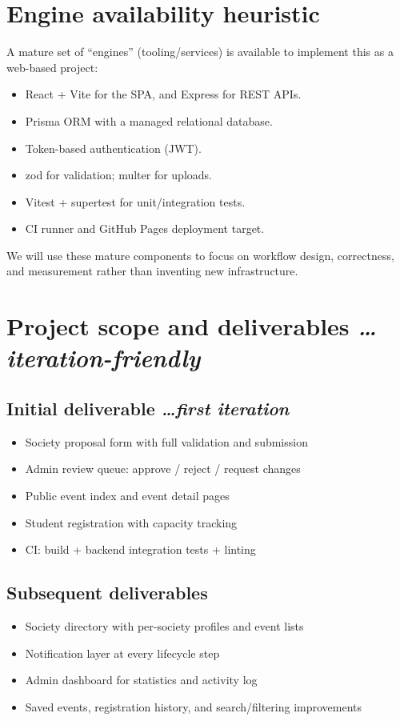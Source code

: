 \documentclass[11pt,a4paper]{article}
\newcommand{\BvrHint}[1]{%
  {\normalfont\normalsize\itshape\hfill #1}}
\begin{document}
\section{Engine availability heuristic}
A mature set of ``engines'' (tooling/services) is
available to implement this as a web-based project:
\begin{itemize}[leftmargin=0.7cm]
    \item React + Vite for the SPA, and Express for REST
      APIs.
    \item Prisma ORM with a managed relational database.
    \item Token-based authentication (JWT).
    \item zod for validation; multer for uploads.
    \item Vitest + supertest for unit/integration tests.
    \item CI runner and GitHub Pages deployment target.
\end{itemize}
We will use these mature components to focus on workflow
design, correctness, and measurement rather than
inventing new infrastructure.

\section{Project scope and deliverables %
\BvrHint{\ldots iteration-friendly}}
\subsection{Initial deliverable %
\BvrHint{\ldots first iteration}}
\begin{itemize}[leftmargin=0.7cm]
    \item Society proposal form with full validation and
      submission
    \item Admin review queue: approve / reject / request
      changes
    \item Public event index and event detail pages
    \item Student registration with capacity tracking
    \item CI: build + backend integration tests + linting
\end{itemize}

\subsection{Subsequent deliverables}
\begin{itemize}[leftmargin=0.7cm]
    \item Society directory with per-society profiles and
      event lists
    \item Notification layer at every lifecycle step
    \item Admin dashboard for statistics and activity log
    \item Saved events, registration history, and
      search/filtering improvements
\end{itemize}
\end{document}
